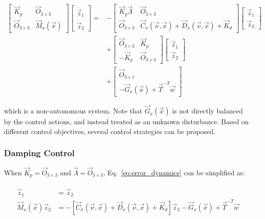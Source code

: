 \begin{sloppypar}
\begin{equation} \label{eq:error_dynamics}
\begin{aligned}
\begin{bmatrix}
\vec{K}_p & \vec{O}_{3\times3} \\
\vec{O}_{3\times3} & \vec{M}_x(\vec{x})
\end{bmatrix} \begin{bmatrix}
\dot{\vec{z}}_1 \\
\dot{\vec{z}}_2
\end{bmatrix} = &-\begin{bmatrix}
\vec{K}_p\vec{\Lambda} & \vec{O}_{3\times3} \\
\vec{O}_{3\times3} & \vec{C}_x(\vec{\nu}, \vec{x}) + \vec{D}_x(\vec{\nu}, \vec{x}) + \vec{K}_d
\end{bmatrix} \begin{bmatrix}
\vec{z}_1 \\
\vec{z}_2
\end{bmatrix} \\
&+ \begin{bmatrix}
\vec{O}_{3\times3} & \vec{K}_p \\
-\vec{K}_p & \vec{O}_{3\times3}
\end{bmatrix} \begin{bmatrix}
\vec{z}_1 \\
\vec{z}_2
\end{bmatrix} \\
&+ \begin{bmatrix}
\vec{O}_{3\times1} \\
-\vec{G}_x(\vec{x}) + \vec{T}^{-T}\vec{w}
\end{bmatrix}
\end{aligned}
\end{equation}

\noindent which is a non-autonomous system. Note that $\vec{G}_x(\vec{x})$ is not directly balanced by the control actions, and instead treated as an unknown disturbance. Based on different control objectives, several control strategies can be proposed.

\subsubsection{Damping Control}
When $\vec{K}_p = \vec{O}_{3\times3}$ and $\vec{\Lambda} = \vec{O}_{3\times3}$, Eq.~\ref{eq:error_dynamics} can be simplified as:

\begin{align}
\dot{\vec{z}}_1 &= \vec{z}_2 \\
\vec{M}_x(\vec{x})\dot{\vec{z}}_2 &= -\left[ \vec{C}_x(\vec{\nu}, \vec{x}) + \vec{D}_x(\vec{\nu}, \vec{x}) + \vec{K}_d \right]\vec{z}_2 - \vec{G}_x(\vec{x}) + \vec{T}^{-T}\vec{w} 
\end{align}


\end{sloppypar}
